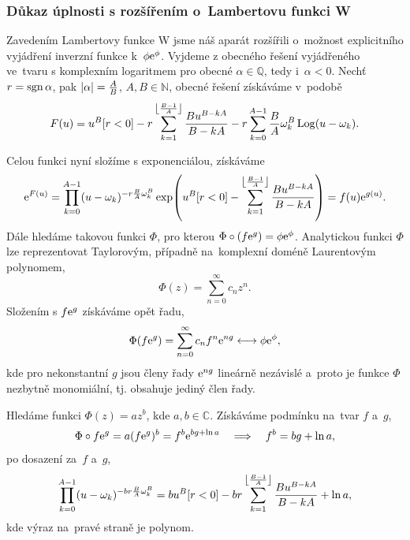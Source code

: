 \subsubsection{Důkaz úplnosti s rozšířením o~Lambertovu funkci W}\label{dukaz_uplnosti_s_rozsirenim_o_lambertovu_funkci_w}
Zavedením Lambertovy funkce W jsme náš aparát rozšířili o~možnost explicitního vyjádření inverzní funkce k~$\phi\mathrm{e}^{\phi}$. Vyjdeme z obecného řešení vyjádřeného ve~tvaru s komplexním logaritmem pro obecné $\alpha \in \mathbb{Q}$, tedy i~$\alpha<0$. Nechť $r=\operatorname{sgn} \alpha$, pak $\left\lvert\alpha\right\rvert=\frac{A}{B}$, $A,B\in\mathbb{N}$, obecné řešení získáváme v~podobě
\begin{equation}
    F(u)=u^B[r<0]-r\sum_{k=1}^{\left\lfloor\frac{B-1}{A}\right\rfloor}\frac{Bu^{B-kA}}{B-kA}-r\sum_{k=0}^{A-1}\frac{B}{A}\omega_k^B\operatorname{Log}(u-\omega_k).
\end{equation}

Celou funkci nyní složíme s exponenciálou, získáváme
\begin{equation}
    \mathrm{e}^{F(u)}=\prod_{k=0}^{A-1}(u-\omega_k)^{-r\frac{B}{A}\omega_k^B}\exp\!\left(u^B[r<0]-\sum_{k=1}^{\left\lfloor\frac{B-1}{A}\right\rfloor}\frac{Bu^{B-kA}}{B-kA}\right)=f(u)\mathrm{e}^{g(u)}.
\end{equation}
Dále hledáme takovou funkci $\Phi$, pro kterou $\Phi\circ \left(f\mathrm{e}^{g}\right)=\phi\mathrm{e}^{\phi}$. Analytickou funkci $\Phi$ lze reprezentovat Taylorovým, případně na~komplexní doméně Laurentovým polynomem,
\begin{equation}
    \Phi(z)=\sum_{n=0}^{\infty}c_n z^n.
\end{equation}
Složením s $f\mathrm{e}^{g}$ získáváme opět řadu, 
\begin{equation}
    \Phi(f\mathrm{e}^{g})=\sum_{n=0}^{\infty}c_nf^n\mathrm{e}^{ng} \longleftrightarrow \phi \mathrm{e}^{\phi},
\end{equation}
kde pro nekonstantní $g$ jsou členy řady $\mathrm{e}^{ng}$ lineárně nezávislé a~proto je funkce $\Phi$ nezbytně monomiální, tj. obsahuje jediný člen řady.

Hledáme funkci $\Phi(z)=az^b$, kde $a,b\in\mathbb{C}$. Získáváme podmínku na~tvar $f$ a~$g$,
\begin{equation}
    \Phi\circ f\mathrm{e}^{g} = a(f\mathrm{e}^{g})^b = f^b \mathrm{e}^{b g+\ln a}\quad \Longrightarrow\quad f^b=bg+\ln{a},
\end{equation}
po dosazení za~$f$ a~$g$,
\begin{equation}\label{eq:condition_for_lambert_general}
    \prod_{k=0}^{A-1}(u-\omega_k)^{-br\frac{B}{A}\omega_k^B}=bu^B[r<0]-br\sum_{k=1}^{\left\lfloor\frac{B-1}{A}\right\rfloor}\frac{Bu^{B-kA}}{B-kA}+\ln a,
\end{equation}
kde výraz na~pravé straně je polynom. 


